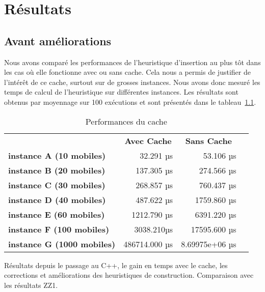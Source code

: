 \chapter{Résultats}
    \section{Avant améliorations}
        Nous avons comparé les performances de l'heuristique d'insertion au plus tôt dans les cas où elle fonctionne avec ou sans cache. Cela nous a permis de justifier de l'intérêt de ce cache, surtout sur de grosses instances. Nous avons donc mesuré les temps de calcul de l'heuristique sur différentes instances. Les résultats sont obtenus par moyennage sur 100 exécutions et sont présentés dans le tableau~\ref{tab:cache-perf}.

        \begin{table}[H]
            \centering
            \begin{tabular}{l|r|r|l}
            \cline{2-3}
                                                                     & \multicolumn{1}{c|}{\textbf{Avec Cache}} & \multicolumn{1}{c|}{\textbf{Sans Cache}} &  \\ \cline{1-3}
            \multicolumn{1}{|l|}{\textbf{instance A (10 mobiles)}}   & 32.291 µs                               & 53.106 µs                               &  \\ \cline{1-3}
            \multicolumn{1}{|l|}{\textbf{instance B (20 mobiles)}}   & 137.305 µs                               & 274.566 µs                               &  \\ \cline{1-3}
            \multicolumn{1}{|l|}{\textbf{instance C (30 mobiles)}}   & 268.857 µs                               & 760.437 µs                               &  \\ \cline{1-3}
            \multicolumn{1}{|l|}{\textbf{instance D (40 mobiles)}}   & 487.622 µs                               & 1759.860 µs                               &  \\ \cline{1-3}
            \multicolumn{1}{|l|}{\textbf{instance E (60 mobiles)}}   & 1212.790 µs                               & 6391.220 µs                               &  \\ \cline{1-3}
            \multicolumn{1}{|l|}{\textbf{instance F (100 mobiles)}}  & 3038.210µs                                & 17595.600 µs                               &  \\ \cline{1-3}
            \multicolumn{1}{|l|}{\textbf{instance G (1000 mobiles)}} & 486714.000 µs                                & 8.69975e+06 µs                           &  \\ \cline{1-3}
            \end{tabular}
            \caption{Performances du cache}
            \label{tab:cache-perf}
        \end{table}
    	Résultats depuis le passage au C++, le gain en temps avec le cache, les corrections et améliorations des heuristiques de construction.
    	Comparaison avec les résultats ZZ1.
